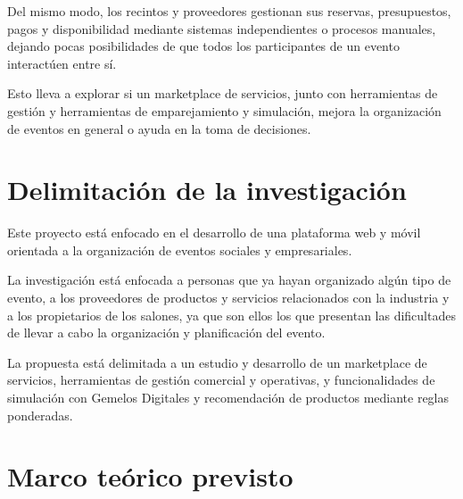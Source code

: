 Del mismo modo, los recintos y proveedores gestionan sus reservas,
presupuestos, pagos y disponibilidad mediante sistemas independientes o
procesos manuales, dejando pocas posibilidades de que todos los
participantes de un evento interactúen entre sí.

Esto lleva a explorar si un marketplace de servicios, junto con
herramientas de gestión y herramientas de emparejamiento y
simulación, mejora la organización de eventos en general o ayuda en la
toma de decisiones.

\section{Delimitación de la investigación}

Este proyecto está enfocado en el desarrollo de una plataforma web y móvil
orientada a la organización de eventos sociales y empresariales.

La investigación está enfocada a personas que ya hayan organizado algún
tipo de evento, a los proveedores de productos y servicios relacionados
con la industria y a los propietarios de los salones, ya que son ellos
los que presentan las dificultades de llevar a cabo la organización y
planificación del evento.

La propuesta está delimitada a un estudio y desarrollo de un marketplace
de servicios, herramientas de gestión comercial y operativas, y
funcionalidades de simulación con Gemelos Digitales y
recomendación de productos mediante reglas ponderadas.

\section{Marco teórico previsto}

